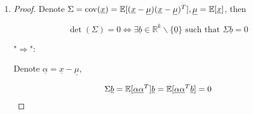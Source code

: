 \documentclass[a4paper]{article}
\begin{document}
\begin{enumerate}
\begin{enumerate}
\begin{enumerate}
\begin{proof}
      Meanwhile,

      \begin{equation}
        \begin{aligned}
          \cov(\EX[\underline{x}|y]) & = \EX [ \EX[\underline{x}|y]\cdot (\EX[\underline{x}|y])^T ]- \EX[\EX[x|y]] \cdot (\EX[\EX[x|y]])^T \\
          & = \EX [ \EX[\underline{x}|y]\cdot (\EX[\underline{x}|y])^T ]- \EX[x]\cdot(\EX[x])^T 
        \end{aligned}
      \end{equation}

    Therefore,

    \begin{equation}
      \begin{aligned}
        \EX[\cov(\underline{x}|y)]+ \cov (\EX[\underline{x} | y]) = & \EX [\underline{x}\cdot\underline{x}^T] - \EX[\EX[\underline{x}|y] \cdot (\EX[\underline{x}|y])^T]] \\ 
        & + \EX [ \EX[\underline{x}|y]\cdot (\EX[\underline{x}|y])^T ]- \EX[x]\cdot(\EX[x])^T 
         \\ = &\EX [\underline{x}\cdot\underline{x}^T]- \EX[x]\cdot(\EX[x])^T  \\ =&\cov(\underline{x})
      \end{aligned}
    \end{equation}

      \end{proof}

    \item \begin{proof}
      Denote $\Sigma = \operatorname{cov}(\underline{x}) = \mathbb{E}[(\underline{x} - \underline{\mu})(\underline{x} - \underline{\mu})^T], \underline{\mu} = \mathbb{E}[\underline{x}]$, then 

      \begin{equation}
        \det(\Sigma) = 0 \Longleftrightarrow \exists \underline{b}\in \mathbb{R}^k \backslash \{\underline{0}\} \text{ such that } \Sigma \underline{b} = 0
      \end{equation}

      "$\Longrightarrow$":

      Denote $\underline{\alpha} = \underline{x} - \underline{\mu}$, 

      \begin{equation}
        \begin{aligned}
          \Sigma \underline{b} = \mathbb{E}[\underline{\alpha}\underline{\alpha}^T] \underline{b} = \mathbb{E}[\underline{\alpha}\underline{\alpha}^T \underline{b}]   = 0
        \end{aligned}
      \end{equation}


\end{proof}
\end{enumerate}
\end{enumerate}
\end{enumerate}
\end{document}
